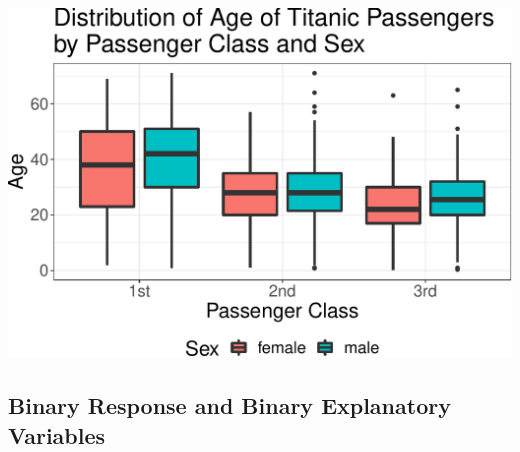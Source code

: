 \documentclass[]{article}
\begin{document}
\includegraphics{Visualization_Examples_2020_v01_files/figure-latex/unnamed-chunk-4-1.pdf}

\hypertarget{binary-response-and-binary-explanatory-variables}{%
\subsection{Binary Response and Binary Explanatory
Variables}\label{binary-response-and-binary-explanatory-variables}}
\end{document}
